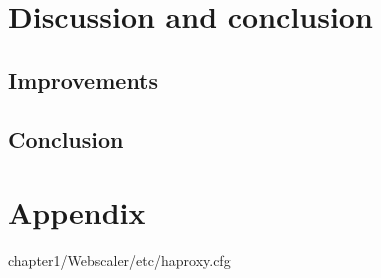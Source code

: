 \section{Discussion and conclusion}
\subsection{Improvements}

\subsection{Conclusion}

\section{Appendix}

{chapter1/Webscaler/etc/haproxy.cfg}
